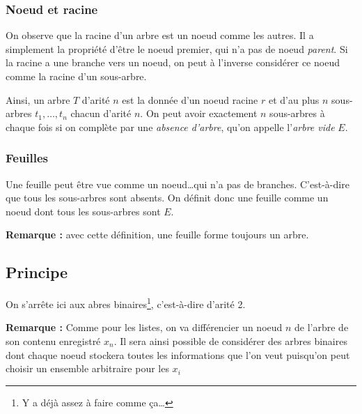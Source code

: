 \documentclass[../../../main.tex]{subfiles}
\begin{document}
\subsubsection{Noeud et racine}
On observe que la racine d'un arbre est un noeud comme les autres. Il a simplement la propriété d'être le noeud premier, qui n'a pas de noeud \textit{parent}. Si la racine a une branche vers un noeud, on peut à l'inverse considérer ce noeud comme la racine d'un sous-arbre.

Ainsi, un arbre $T$ d'arité $n$ est la donnée d'un noeud racine $r$ et d'au plus $n$ sous-arbres $t_1, \dots, t_n$ chacun d'arité $n$. On peut avoir exactement $n$ sous-arbres à chaque fois si on complète par une \textit{absence d'arbre}, qu'on appelle l'\textit{arbre vide} $E$.
\subsubsection{Feuilles}
Une feuille peut être vue comme un noeud\dots qui n'a pas de branches. C'est-à-dire que tous les sous-arbres sont absents. On définit donc une feuille comme un noeud dont tous les sous-arbres sont $E$.

\textbf{Remarque :} avec cette définition, une feuille forme toujours un arbre.
\subsection{Principe}
On s'arrête ici aux abres binaires\footnote{Y a déjà assez à faire comme ça\dots}, c'est-à-dire d'arité 2.

\textbf{Remarque :} Comme pour les listes, on va différencier un noeud $n$ de l'arbre de son contenu enregistré $x_n$. Il sera ainsi possible de considérer des arbres binaires dont chaque noeud stockera toutes les informations que l'on veut puisqu'on peut choisir un ensemble arbitraire pour les $x_i$
\end{document}
